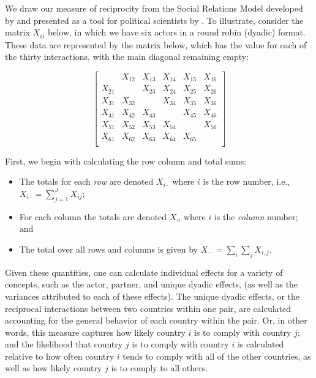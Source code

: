 
We draw our measure of reciprocity from the Social Relations Model developed by \citet{kenny1994interpersonal} and presented as a tool for political scientists by \cite{AnneAuthor}. To illustrate, consider the matrix $X_{ij}$ below, in which we have six actors in a round robin (dyadic) format. These data are represented by the matrix below, which has the value for each of the thirty interactions, with the main diagonal remaining empty:

\singlespacing
\[
\left[
\begin{array}{cccccc}
 & X_{12}  & X_{13}  & X_{14} & X_{15} & X_{16} \\
X_{21}  &  & X_{23}  & X_{24} & X_{25} & X_{26} \\
X_{31}  & X_{32}  &    & X_{34} & X_{35} & X_{36} \\
X_{41}  & X_{42}  & X_{43}  &  & X_{45} & X_{46} \\
X_{51}  & X_{52}  & X_{53}  & X_{54} &   & X_{56} \\
X_{61}  & X_{62}  & X_{63}  & X_{64} & X_{65} &   \\
\end{array}
\right]
\]

\doublespacing
First, we begin with calculating the row column and total sums:
\begin{itemize}
\item The totals for each \emph{ row} are denoted $X_{i \cdot}$ where $i$ is the row number, i.e.,
~\\
$X_{i \cdot} = \sum_{j=1}^{J} X_{ij}$;
\item For each column the totals are denoted
 $X_{\cdot i}$ where $i$ is the \emph{column} number; and 
 \item The total over all rows and columns is given by $X_{\cdot \cdot} = \sum_i \sum_j X_{i,j}$.
 \end{itemize}
 
Given these quantities, one can calculate individual effects for a variety of concepts, such as the actor, partner, and unique dyadic effects, (as well as the variances attributed to each of these effects). The unique dyadic effects, or the reciprocal interactions between two countries within one pair, are calculated accounting for the general behavior of each country within the pair. Or, in other words, this measure captures how likely country $i$ is to comply with country $j$; and the likelihood that country $j$ is to comply with country $i$ is calculated relative to how often country $i$ tends to comply with all of the other countries, as well as how likely country $j$ is to comply to all others. 

